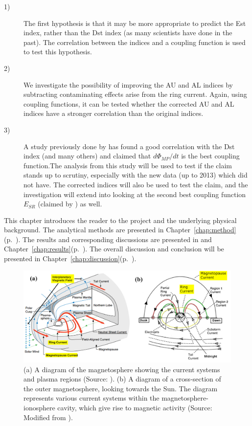 \documentclass[12pt]{report} %
\begin{document}
\begin{description}
  \item[1)] The first hypothesis is that it may be more appropriate to predict the Est index, rather than the Dst index (as many scientists have done in the past). The correlation between the indices and a coupling function is used to test this hypothesis. 
  
  \item[2)] We investigate the possibility of improving the AU and AL indices by subtracting contaminating effects arise from the ring current. Again, using coupling functions, it can be tested whether the corrected AU and AL indices have a stronger correlation than the original indices. 
  
  \item[3)] A study previously done by \cite{newell07} has found a good correlation with the Dst index (and many others) and claimed that $d\Phi_{MP}/dt$ is the best coupling function.The analysis from this study will be used to test if the claim stands up to scrutiny, especially with the new data (up to 2013) which \cite{newell07} did not have. The corrected indices will also be used to test the claim, and the investigation will extend into looking at  the second best coupling function $E_{SR}$ (claimed by \cite{newell07}) as well. 
\end{description}
  \noindent This chapter introduces the reader to the project and the underlying physical background. The analytical methods are presented in Chapter~\ref{chap:method} (p.~\pageref{chap:method}). The results and corresponding discussions are presented in  and Chapter~\ref{chap:results}(p.~\pageref{chap:results}). The overall discussion and conclusion will be presented in Chapter~\ref{chap:discussion}(p.~\pageref{chap:discussion}).
    
\begin{figure}
\centering
 \vspace{0pt}
    \includegraphics[width=1.05\textwidth]{./magnetosphere}
 \vspace{0pt}
  \caption{(a) A diagram of the magnetosphere showing the current systems and plasma regions (Source: \cite{russell00}). (b) A diagram of a cross-section of the outer magnetosphere, looking towards the Sun. The diagram represents various current systems within the magnetosphere-ionosphere cavity, which give rise to magnetic activity  (Source: Modified from \cite{mcpher95}).} \label{fig:magnetosphere}
   \vspace{5pt}
\end{figure} 
\vspace{-10pt}
\end{document}
